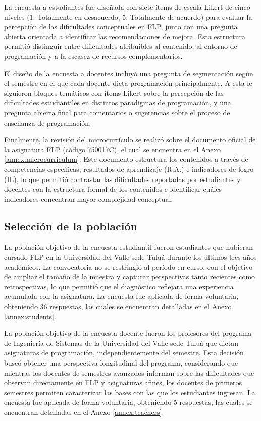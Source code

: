 La encuesta a estudiantes fue diseñada con siete ítems de escala Likert de cinco niveles (1: Totalmente en desacuerdo, 5: Totalmente de acuerdo) para evaluar la percepción de las dificultades conceptuales en FLP, junto con una pregunta abierta orientada a identificar las recomendaciones de mejora. Esta estructura permitió distinguir entre dificultades atribuibles al contenido, al entorno de programación y a la escasez de recursos complementarios.

El diseño de la encuesta a docentes incluyó una pregunta de segmentación según el semestre en el que cada docente dicta programación principalmente. A esta le siguieron bloques temáticos con ítems Likert sobre la percepción de las dificultades estudiantiles en distintos paradigmas de programación, y una pregunta abierta final para comentarios o sugerencias sobre el proceso de enseñanza de programación.

Finalmente, la revisión del microcurrículo se realizó sobre el documento oficial de la asignatura FLP (código 750017C), el cual se encuentra en el Anexo \ref{annex:microcurriculum}. Este documento estructura los contenidos a través de competencias específicas, resultados de aprendizaje (R.A.) e indicadores de logro (IL), lo que permitió contrastar las dificultades reportadas por estudiantes y docentes con la estructura formal de los contenidos e identificar cuáles indicadores concentran mayor complejidad conceptual.

\subsection{Selección de la población}

La población objetivo de la encuesta estudiantil fueron estudiantes que hubieran cursado FLP en la Universidad del Valle sede Tuluá durante los últimos tres años académicos. La convocatoria no se restringió al período en curso, con el objetivo de ampliar el tamaño de la muestra y capturar perspectivas tanto recientes como retrospectivas, lo que permitió que el diagnóstico reflejara una experiencia acumulada con la asignatura. La encuesta fue aplicada de forma voluntaria, obteniendo 36 respuestas, las cuales se encuentran detalladas en el Anexo \ref{annex:students}.

La población objetivo de la encuesta docente fueron los profesores del programa de Ingeniería de Sistemas de la Universidad del Valle sede Tuluá que dictan asignaturas de programación, independientemente del semestre. Esta decisión buscó obtener una perspectiva longitudinal del programa, considerando que mientras los docentes de semestres avanzados informan sobre las dificultades que observan directamente en FLP y asignaturas afines, los docentes de primeros semestres permiten caracterizar las bases con las que los estudiantes ingresan. La encuesta fue aplicada de forma voluntaria, obteniendo 5 respuestas, las cuales se encuentran detalladas en el Anexo \ref{annex:teachers}.